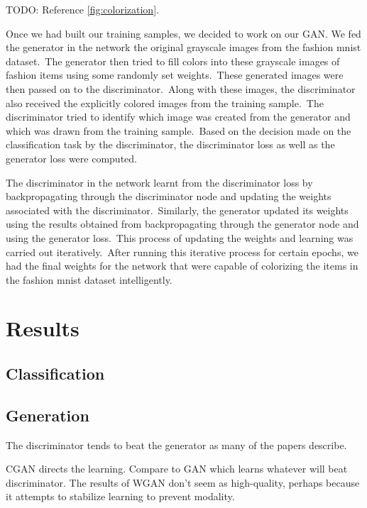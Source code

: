 \documentclass[conference]{IEEEtran}
\begin{document}
    TODO: Reference \autoref{fig:colorization}.

    Once we had built our training samples, we decided to work on our GAN. We fed the generator in the network the original grayscale images from the fashion mnist dataset.\ The generator then tried to fill colors into these grayscale images of fashion items using some randomly set weights.\ These generated images were then passed on to the discriminator.\ Along with these images, the discriminator also received the explicitly colored images from the training sample.\ The discriminator tried to identify which image was created from the generator and which was drawn from the training sample.\ Based on the decision made on the classification task by the discriminator, the discriminator loss as well as the generator loss were computed.

    The discriminator in the network learnt from the discriminator loss by backpropagating through the discriminator node and updating the weights associated with the discriminator.\ Similarly, the generator updated its weights using the results obtained from backpropagating through the generator node and using the generator loss.\ This process of updating the weights and learning was carried out iteratively.\ After running this iterative process for certain epochs, we had the final weights for the network that were capable of colorizing the items in the fashion mnist dataset intelligently.

    \section{Results}\label{sec:results}

    \subsection{Classification}\label{subsec:results-classification}

    \subsection{Generation}\label{subsec:results-generation}

    The discriminator tends to beat the generator as many of the papers describe.

    CGAN directs the learning. Compare to GAN which learns whatever will beat discriminator. The results of WGAN don't seem as high-quality, perhaps because it attempts to stabilize learning to prevent modality.
\end{document}
